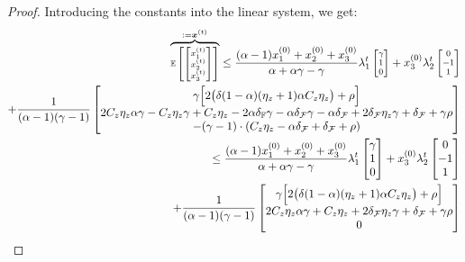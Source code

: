 \begin{proof}
    Introducing the constants into the linear system, we get:
    \begin{align*}
        \scriptsize
        \overbrace{\mathbb{E}\begin{bmatrix}\begin{bmatrix}
            x_1^{(t)}\\
            x_2^{(t)}\\
            x_3^{(t)} 
        \end{bmatrix}\end{bmatrix}}^{:=\bm{x}^{(t)}}
        \leq
        \frac{(\alpha - 1)x_1^{(0)}+x_2^{(0)}+x_3^{(0)} }{\alpha + \alpha\gamma - \gamma}
        \lambda_1^t 
        \begin{bmatrix}
            \gamma \\ 1 \\ 0
        \end{bmatrix}
        + x_3^{(0)}
        \lambda_2^t
        \begin{bmatrix}
            0 \\ -1 \\ 1
        \end{bmatrix}
        \\  +
        \frac{1}{(\alpha-1)(\gamma-1)}
        \begin{bmatrix}
            \gamma\Big[ 2\big( \delta (1-\alpha)(\eta_z+1) \alpha C_z \eta_z \big) + \rho \Big] \\
            2C_z \eta_z \alpha \gamma - C_z \eta_z \gamma + C_z \eta_z - 2 \alpha \delta_\mathbb{F} \gamma - \alpha \delta_\mathcal{F} \gamma - \alpha \delta_\mathcal{F} + 2 \delta_\mathcal{F} \eta_z \gamma + \delta_\mathcal{F} + \gamma \rho \\
            -(\gamma-1) \cdot ( C_z \eta_z - \alpha \delta_\mathcal{F} + \delta_\mathcal{F} + \rho )
        \end{bmatrix} \\
        \leq \frac{(\alpha - 1)x_1^{(0)}+x_2^{(0)}+x_3^{(0)} }{\alpha + \alpha\gamma - \gamma}
        \lambda_1^t 
        \begin{bmatrix}
            \gamma \\ 1 \\ 0
        \end{bmatrix}
        + x_3^{(0)}
        \lambda_2^t
        \begin{bmatrix}
            0 \\ -1 \\ 1
        \end{bmatrix}
        \\  +
        \frac{1}{(\alpha-1)(\gamma-1)}
        \begin{bmatrix}
            \gamma\Big[ 2\big( \delta (1-\alpha)(\eta_z+1) \alpha C_z \eta_z \big) + \rho \Big] \\
            2C_z \eta_z \alpha \gamma + C_z \eta_z  + 2 \delta_\mathcal{F} \eta_z \gamma + \delta_\mathcal{F} + \gamma \rho \\
            0
        \end{bmatrix} 
    \end{align*}


\end{proof}
